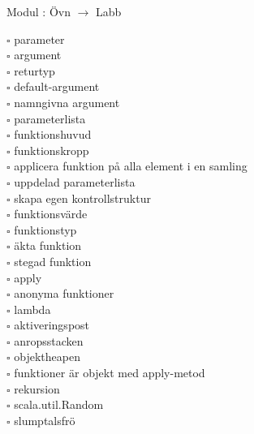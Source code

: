 
    Modul : Övn  $\rightarrow$ Labb 
    \begin{multicols}{3}\SlideFontTiny
    $\square$ parameter \\
$\square$ argument \\
$\square$ returtyp \\
$\square$ default-argument \\
$\square$ namngivna argument \\
$\square$ parameterlista \\
$\square$ funktionshuvud \\
$\square$ funktionskropp \\
$\square$ applicera funktion på alla element i en samling \\
$\square$ uppdelad parameterlista \\
$\square$ skapa egen kontrollstruktur \\
$\square$ funktionsvärde \\
$\square$ funktionstyp \\
$\square$ äkta funktion \\
$\square$ stegad funktion \\
$\square$ apply \\
$\square$ anonyma funktioner \\
$\square$ lambda \\
$\square$ aktiveringspost \\
$\square$ anropsstacken \\
$\square$ objektheapen \\
$\square$ funktioner är objekt med apply-metod \\
$\square$ rekursion \\
$\square$ scala.util.Random \\
$\square$ slumptalsfrö \\
    \end{multicols}
    